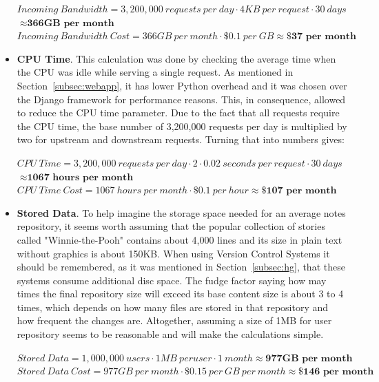 \begin{itemize}
{$Incoming\ Bandwidth =  3,200,000\ requests\ per\ day \cdot 4KB\ per\ request \cdot 30\ days$\\ \hspace*{33mm} $\approx \textbf{366GB\ per\ month}$ \\
$Incoming\ Bandwidth\ Cost = 366GB\ per\ month \cdot \$0.1\ per\ GB \approx \textbf{\$37 per\ month}$ }
 
\item{\textbf{CPU Time}. This calculation was done by checking the average time when the CPU was idle while serving a single request. As mentioned in Section~\ref{subsec:webapp}, it has lower Python overhead and it was chosen over the Django framework for performance reasons. This, in consequence, allowed to reduce the CPU time parameter. Due to the fact that all requests require the CPU time, the base number of 3,200,000 requests per day is multiplied by two for upstream and downstream requests. Turning that into numbers gives:
 
$CPU\ Time =  3,200,000\ requests\ per\ day \cdot 2 \cdot 0.02\ seconds\ per\ request \cdot 30\ days$\\ \hspace*{17mm} $\approx \textbf{1067\ hours\ per\ month}$ \\
$CPU\ Time\ Cost = 1067\ hours\ per\ month \cdot \$0.1\ per\ hour \approx \textbf{\$107 per\ month}$}
 
\item{\textbf{Stored Data}. To help imagine the storage space needed for an average notes repository, it seems worth assuming that the popular collection of stories called "Winnie-the-Pooh" contains about 4,000 lines and its size in plain text without graphics is about 150KB. When using Version Control Systems it should be remembered, as it was mentioned in Section~\ref{subsec:hg}, that these systems consume additional disc space. The fudge factor saying how may times the final repository size will exceed its base content size is about 3 to 4 times, which depends on how many files are stored in that repository and how frequent the changes are. Altogether, assuming a size of 1MB for user repository seems to be reasonable and will make the calculations simple.
 
$Stored\ Data =  1,000,000\ users\cdot 1MB\ per user \cdot 1\ month \approx \textbf{977GB\ per\ month}$ \\
$Stored\ Data\ Cost = 977GB\ per\ month \cdot \$0.15\ per\ GB\ per\ month \approx \textbf{\$146 per\ month}$}
 

\end{itemize}
